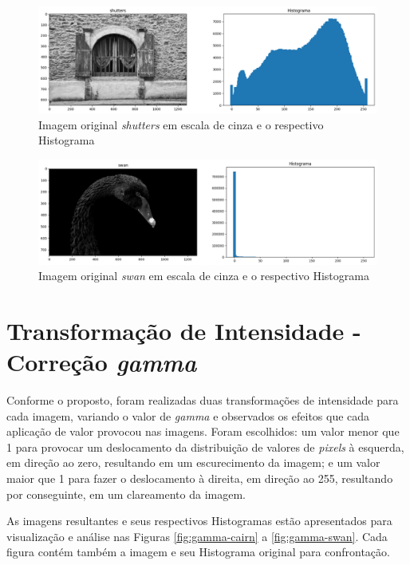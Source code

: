 \begin{figure}
    \includegraphics[width=1\linewidth]{Elementos/Figuras/resultados-histograma-shutters.png}
    \caption{Imagem original \textit{shutters} em escala de cinza e o respectivo Histograma}
    \label{fig:hist-shutters}
\end{figure}

\begin{figure}
    \includegraphics[width=1\linewidth]{Elementos/Figuras/resultados-histograma-swan.png}
    \caption{Imagem original \textit{swan} em escala de cinza e o respectivo Histograma}
    \label{fig:hist-swan}
\end{figure}


\section{Transformação de Intensidade - Correção \textit{gamma}}

Conforme o proposto, foram realizadas duas transformações de intensidade para cada imagem, variando o valor de \textit{gamma} e observados os efeitos que cada aplicação de valor provocou nas imagens. Foram escolhidos: um valor menor que 1 para provocar um deslocamento da distribuição de valores de \textit{pixels} à esquerda, em direção ao zero, resultando em um escurecimento da imagem; e um valor maior que 1 para fazer o deslocamento à direita, em direção ao 255, resultando por conseguinte, em um clareamento da imagem.

As imagens resultantes e seus respectivos Histogramas estão apresentados para visualização e análise nas Figuras \ref{fig:gamma-cairn} a \ref{fig:gamma-swan}. Cada figura contém também a imagem e seu Histograma original para confrontação.

